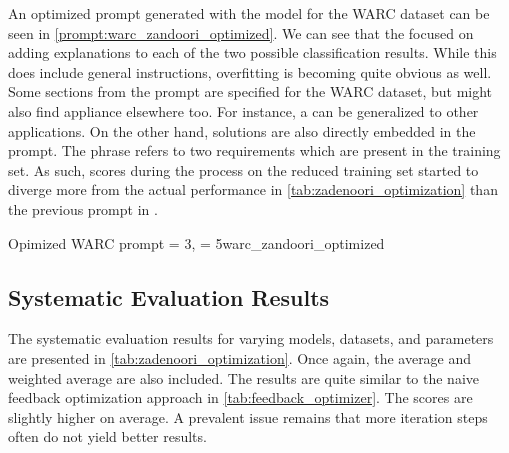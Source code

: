 An optimized prompt generated with the \gpt model for the WARC dataset can be seen in \autoref{prompt:warc_zandoori_optimized}.
We can see that the \LLM focused on adding explanations to each of the two possible classification results.
While this does include general instructions, overfitting is becoming quite obvious as well.
Some sections from the prompt are specified for the WARC dataset, but might also find appliance elsewhere too.
For instance, a  can be generalized to other applications.
On the other hand, solutions are also directly embedded in the prompt.
The phrase  refers to two requirements which are present in the training set.
As such, \fone scores during the \APE process on the reduced training set started to diverge more from the actual performance in \autoref{tab:zadenoori_optimization} than the previous prompt in .

\begin{prompt}{Opimized WARC prompt \feed = 3, \iter = 5}{warc_zandoori_optimized}
    \\
    
\end{prompt}

\subsection{Systematic Evaluation Results}
\label{subsec:Evaluation:varying-the-optimization-prompt:systematic-evaluation-results}

The systematic evaluation results for varying models, datasets, and parameters are presented in \autoref{tab:zadenoori_optimization}.
Once again, the average and weighted average are also included.
The results are quite similar to the naive feedback optimization approach in \autoref{tab:feedback_optimizer}.
The \fone scores are slightly higher on average.
A prevalent issue remains that more iteration steps often do not yield better results.

\begin{table}
    \centering
    \renewcommand{\arraystretch}{1.4}
    
    \renewcommand{\arraystretch}{1}
    \caption{Naive prompt optimization approach using the optimization prompt by }
    \label{tab:zadenoori_optimization}
\end{table}